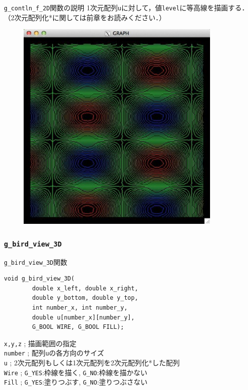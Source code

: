 \documentclass[platex,a4paper,12pt]{jsarticle}%
\begin{document}
\begin{itembox}[l]{\texttt{g\_contln\_f\_2D}関数の説明}
1次元配列\verb|u|に対して，値\verb|level|に等高線を描画する．
（2次元配列化*に関しては前章をお読みください．）
\end{itembox}

\begin{figure}[htb]
	\includegraphics[width=100mm]{./Figures/eps/Canvas_g_contln.eps}
\end{figure}




\clearpage
\subsubsection{\texttt{g\_bird\_view\_3D}}

\begin{itembox}[l]{\texttt{g\_bird\_view\_3D}関数}
\begin{verbatim}
void g_bird_view_3D(
        double x_left, double x_right, 
        double y_bottom, double y_top,
        int number_x, int number_y,
        double u[number_x][number_y],
        G_BOOL WIRE, G_BOOL FILL);
\end{verbatim}
\verb|x,y,z| ; 描画範囲の指定\\
\verb|number| ; 配列\verb|u|の各方向のサイズ\\
\verb|u| ; 2次元配列もしくは1次元配列を2次元配列化*した配列\\
\verb|Wire| ; \verb|G_YES|:枠線を描く, \verb|G_NO|:枠線を描かない \\
\verb|Fill| ; \verb|G_YES|:塗りつぶす, \verb|G_NO|:塗りつぶさない 
\end{itembox}
\end{document}
